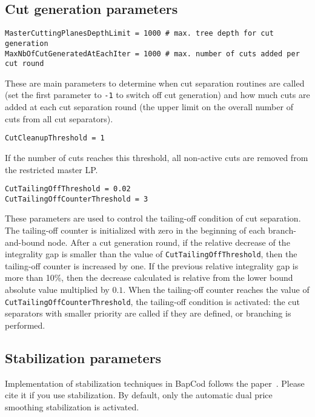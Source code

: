 \documentclass[10pt,a4paper]{article}
\begin{document}
\subsection{Cut generation parameters}
\label{sec:cutgenconfig}

\begin{lstlisting}
MasterCuttingPlanesDepthLimit = 1000 # max. tree depth for cut generation
MaxNbOfCutGeneratedAtEachIter = 1000 # max. number of cuts added per cut round
\end{lstlisting}
These are main parameters to determine when cut separation routines are called (set the first parameter to \verb+-1+ to
switch off cut generation) and how much cuts are added at each cut separation round (the upper limit on the overall
number of cuts from all cut separators).

\begin{lstlisting}
CutCleanupThreshold = 1 
\end{lstlisting}
If the number of cuts reaches this threshold, all non-active cuts are removed from the restricted master LP.

\begin{lstlisting}
CutTailingOffThreshold = 0.02
CutTailingOffCounterThreshold = 3
\end{lstlisting}
These parameters are used to control the tailing-off condition of cut separation. The tailing-off counter is initialized
with zero in the beginning of each branch-and-bound node. After a cut generation round, if the relative decrease of the
integrality gap is smaller than the value of \verb+CutTailingOffThreshold+, then the tailing-off counter is increased by
one. If the previous relative integrality gap is more than 10\%, then the decrease calculated is relative from the lower
bound absolute value multiplied by $0.1$. When the tailing-off counter reaches the value of
\verb+CutTailingOffCounterThreshold+, the tailing-off condition is activated: the cut separators with smaller priority
are called if they are defined, or branching is performed.

\subsection{Stabilization parameters}
\label{sec:stabconfig}

Implementation of stabilization techniques in BapCod follows the paper~\cite{PessoaSadykovUchoa:18b}. Please cite it if
you use stabilization. By default, only the automatic dual price smoothing stabilization is activated. 
\end{document}
